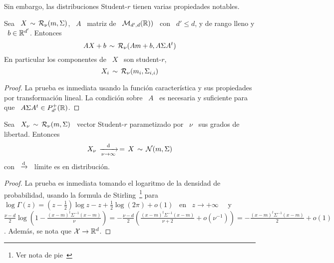 Sin embargo, las distribuciones Student-$r$ tienen varias propiedades notables.

\begin{lema}
\label{Lem:MP:StabilidadLinealStudentR}
%
  Sea \ $X \, \sim \,  \mathcal{R}_\nu(m,\Sigma)$, \ $A$ \ matriz de \ $\mathcal{M}_{d',d}(\mathbb{R}))$
  \ con \ $d' \le d$, y de rango lleno y \ $b \in \mathbb{R}^{d'}$. Entonces
  \[
  A X + b\, \sim \, \mathcal{R}_\nu( A m + b , A \Sigma A^t)
  \]
  En particular los componentes de \ $X$ \ son student-$r$,
  \[
  X_i \, \sim \, \mathcal{R}_\nu(m_i , \Sigma_{i,i} )
  \]
\end{lema}
\begin{proof}
  La prueba es inmediata usando  la funci\'on caracter\'istica y sus propiedades
  por  transformaci\'on lineal.  La condici\'on  sobre \  $A$ \  es  necesaria y
  suficiente para que \ $A \Sigma A^t \in P_{d'}^+(\mathbb{R})$.
\end{proof}

\begin{lema}
\label{Lem:MP:LimiteStudentRGaussiana}
%
  Sea \  $X_\nu \, \sim  \, \mathcal{R}_\nu(m,\Sigma)$ \ vector  Student-$r$ parametizado
  por \ $\nu$ \ sus grados de libertad. Entonces
  \[
  X_\nu \, \xrightarrow[\nu \to \infty]{\mathrm{d}} \, = \, X \, \sim \, \mathcal{N}(m,\Sigma)
  \]
  con \ $\displaystyle \xrightarrow[]{\mathrm{d}}$ \ l\'imite es en distribuci\'on.
\end{lema}
\begin{proof}
  La prueba  es inmediata tomando el  logaritmo de la  densidad de probabilidad,
  usando      la     formula      de     Stirling~\footnote{Ver      nota     de
    pie~} para  \ $\log\Gamma(z) = \left(  z - \frac12
  \right)  \log  z  -  z  +  \frac12   \log(2  \pi)  +  o(1)$  \  en  \  $z  \to
  +\infty$~\cite{Sti30, AbrSte70, GraRyz15} \  y \ $\frac{\nu-d}{2} \log\left( 1
    - \frac{(x-m)^t  \Sigma^{-1} (x-m)}{\nu} \right) =  - \frac{\nu-d}{2} \left(
    \frac{(x-m)^t \Sigma^{-1} (x-m)}{\nu+2} + o\left( \nu^{-1} \right) \right) =
  - \frac{(x-m)^t \Sigma^{-1}  (x-m)}{2} + o(1)$. Adem\'as, se  nota que $\mathcal{X} \to
  \mathbb{R}^d$.
\end{proof}


